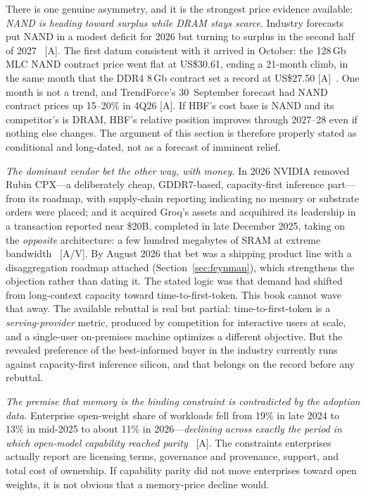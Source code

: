 There is one genuine asymmetry, and it is the strongest price evidence available: \emph{NAND is heading toward surplus while DRAM stays scarce}. Industry forecasts put NAND in a modest deficit for 2026 but turning to surplus in the second half of 2027~\cite{nand-surplus} [A]. The first datum consistent with it arrived in October: the 128\,Gb MLC NAND contract price went flat at US\$30.61, ending a 21-month climb, in the same month that the DDR4 8\,Gb contract set a record at US\$27.50 [A]~\cite{hw-dram-prices}. One month is not a trend, and TrendForce's 30~September forecast had NAND contract prices up 15--20\% in 4Q26 [A]. If HBF's cost base is NAND and its competitor's is DRAM, HBF's relative position improves through 2027--28 even if nothing else changes. The argument of this section is therefore properly stated as conditional and long-dated, not as a forecast of imminent relief.

\emph{The dominant vendor bet the other way, with money.} In 2026 NVIDIA removed Rubin CPX---a deliberately cheap, GDDR7-based, capacity-first inference part---from its roadmap, with supply-chain reporting indicating no memory or substrate orders were placed; and it acquired Groq's assets and acquihired its leadership in a transaction reported near \$20B, completed in late December 2025, taking on the \emph{opposite} architecture: a few hundred megabytes of SRAM at extreme bandwidth~\cite{cpx-cancel,groq-deal} [A/V]. By August 2026 that bet was a shipping product line with a disaggregation roadmap attached (Section~\ref{sec:feynman}), which strengthens the objection rather than dating it. The stated logic was that demand had shifted from long-context capacity toward time-to-first-token. This book cannot wave that away. The available rebuttal is real but partial: time-to-first-token is a \emph{serving-provider} metric, produced by competition for interactive users at scale, and a single-user on-premises machine optimizes a different objective. But the revealed preference of the best-informed buyer in the industry currently runs against capacity-first inference silicon, and that belongs on the record before any rebuttal.

\emph{The premise that memory is the binding constraint is contradicted by the adoption data.} Enterprise open-weight share of workloads fell from 19\% in late 2024 to 13\% in mid-2025 to about 11\% in 2026---\emph{declining across exactly the period in which open-model capability reached parity}~\cite{menlo-openweight} [A]. The constraints enterprises actually report are licensing terms, governance and provenance, support, and total cost of ownership. If capability parity did not move enterprises toward open weights, it is not obvious that a memory-price decline would.

